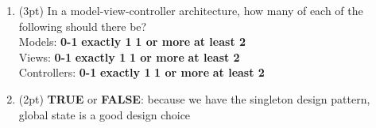 \documentclass{report}
\newif\ifkey
\newcommand{\correct}[1]{\ifkey\color{red}\textbf{#1}\color{black}\else\textbf{#1}\fi\xspace}
\newcommand{\answershort}[1]{\ifkey\color{red}\underline{\textbf{#1}}\color{black}\else\underline{\hspace{3in}}\fi\xspace}
\newcommand*{\pts}[1]{\addtocounter{points}{#1}(#1pt)}
\begin{document}
\begin{spacing}{1.4}
\begin{enumerate}[leftmargin=*]
     \newpage
   \item \pts{3} In a model-view-controller architecture, how many of each of the following should there be?
     \\ Models: \hspace{0.75in} \textbf{0-1} \hspace{0.5in} \correct{exactly 1} \hspace{0.5in} \textbf{1 or more} \hspace{0.5in} \textbf{at least 2}
     \\ Views: \hspace{0.82in} \textbf{0-1} \hspace{0.5in} \textbf{exactly 1} \hspace{0.5in} \correct{1 or more} \hspace{0.5in} \textbf{at least 2}
     \\ Controllers: \hspace{0.51in} \textbf{0-1} \hspace{0.5in} \textbf{exactly 1} \hspace{0.5in} \correct{1 or more} \hspace{0.5in} \textbf{at least 2}

   \item \pts{2} \textbf{TRUE} or \correct{FALSE}: because we have the singleton design pattern, global state is a good design choice





\end{enumerate}
\end{spacing}
\end{document}
